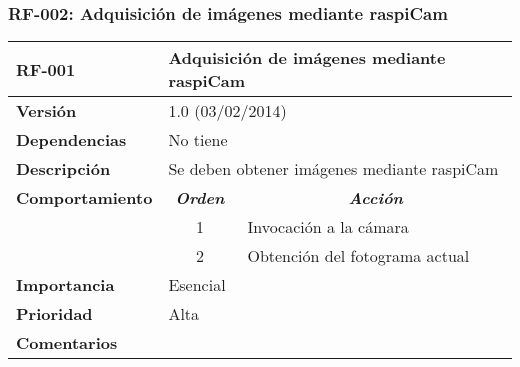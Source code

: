 \subsubsection*{RF-002: Adquisición de imágenes mediante raspiCam}
\begin{tabular}{|l|l|p{10cm}|}
\hline
\textbf{RF-001}         & \multicolumn{2}{l|}{\textbf{Adquisición de imágenes mediante raspiCam}}                                                         \\ \hline
\textbf{Versión}        & \multicolumn{2}{l|}{1.0 (03/02/2014)}                                                                                           \\ \hline
\textbf{Dependencias}   & \multicolumn{2}{l|}{No tiene}                                                                                                   \\ \hline
\textbf{Descripción}    & \multicolumn{2}{l|}{Se deben obtener imágenes mediante raspiCam}                                                                \\ \hline
\textbf{Comportamiento} & \multicolumn{1}{c|}{\textit{\textbf{Orden}}} & \multicolumn{1}{c|}{\textit{\textbf{Acción}}}                                    \\ \hline
                        & \multicolumn{1}{c|}{1}                       & Invocación a la cámara                                                           \\ \cline{2-3} 
                        & \multicolumn{1}{c|}{2}                       & Obtención del fotograma actual                                                   \\ \hline 
\textbf{Importancia}    & \multicolumn{2}{l|}{Esencial}                                                                                                   \\ \hline
\textbf{Prioridad}      & \multicolumn{2}{l|}{Alta}                                                                                                       \\ \hline
\textbf{Comentarios}    & \multicolumn{2}{l|}{}                                                                                                           \\ \hline
\end{tabular}
